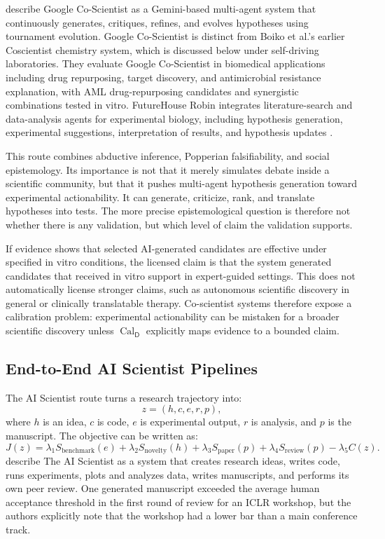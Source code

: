 \documentclass[11pt,a4paper]{article}
\newcommand{\Cal}{\operatorname{Cal}}
\newcommand{\Dom}{\mathsf{D}}
\begin{document}
\citet{Gottweis2026CoScientist} describe Google Co-Scientist as a Gemini-based multi-agent system that continuously generates, critiques, refines, and evolves hypotheses using tournament evolution. Google Co-Scientist is distinct from Boiko et al.'s earlier Coscientist chemistry system, which is discussed below under self-driving laboratories. They evaluate Google Co-Scientist in biomedical applications including drug repurposing, target discovery, and antimicrobial resistance explanation, with AML drug-repurposing candidates and synergistic combinations tested in vitro. FutureHouse Robin integrates literature-search and data-analysis agents for experimental biology, including hypothesis generation, experimental suggestions, interpretation of results, and hypothesis updates \citep{Ghareeb2026Robin}.

This route combines abductive inference, Popperian falsifiability, and social epistemology. Its importance is not that it merely simulates debate inside a scientific community, but that it pushes multi-agent hypothesis generation toward experimental actionability. It can generate, criticize, rank, and translate hypotheses into tests. The more precise epistemological question is therefore not whether there is any validation, but which level of claim the validation supports.

If evidence shows that selected AI-generated candidates are effective under specified in vitro conditions, the licensed claim is that the system generated candidates that received in vitro support in expert-guided settings. This does not automatically license stronger claims, such as autonomous scientific discovery in general or clinically translatable therapy. Co-scientist systems therefore expose a calibration problem: experimental actionability can be mistaken for a broader scientific discovery unless $\Cal_{\Dom}$ explicitly maps evidence to a bounded claim.

\subsection{End-to-End AI Scientist Pipelines}

The AI Scientist route turns a research trajectory into:
\begin{equation}
z=(h,c,e,r,p),
\end{equation}
where $h$ is an idea, $c$ is code, $e$ is experimental output, $r$ is analysis, and $p$ is the manuscript. The objective can be written as:
\begin{equation}
J(z)=
\lambda_1S_{\mathrm{benchmark}}(e)
+\lambda_2S_{\mathrm{novelty}}(h)
+\lambda_3S_{\mathrm{paper}}(p)
+\lambda_4S_{\mathrm{review}}(p)
-\lambda_5C(z).
\end{equation}
\citet{Lu2026AIScientist} describe The AI Scientist as a system that creates research ideas, writes code, runs experiments, plots and analyzes data, writes manuscripts, and performs its own peer review. One generated manuscript exceeded the average human acceptance threshold in the first round of review for an ICLR workshop, but the authors explicitly note that the workshop had a lower bar than a main conference track.
\end{document}
